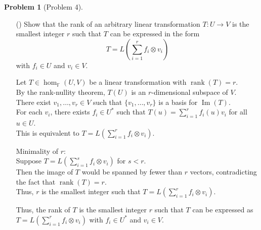 \documentclass[12pt]{article}
\theoremstyle{definition}
\newtheorem{problem}{Problem}
\newcounter{subq}[problem]
\newenvironment{subproblem}
{\refstepcounter{subq} \begin{itemize} \item[(\alph{subq})]}
{\end{itemize} \medskip}
\begin{document}
\begin{problem}[Problem 4]
    \begin{subproblem}
        Show that the rank of an arbitrary linear transformation $T: U \longrightarrow V$
        is the smallest integer $r$ such that $T$ can be expressed in the form
        \[
            T = L(\sum_{i = 1}^{r} f_i \otimes v_i)
        \]
        with $f_i \in U$ and $v_i \in V$.
        
        \begin{solution}
            Let \( T \in \hom_\mathbb{F}(U, V) \) be a linear transformation with \( \operatorname{rank}(T) = r \). \\
            By the rank-nullity theorem, \( T(U) \) is an \( r \)-dimensional subspace of \( V \).\\
            There exist \( v_1, \ldots, v_r \in V \) such that \( \{v_1, \ldots, v_r\} \) is a basis for \( \operatorname{Im}(T) \).\\
            For each \( v_i \), there exists \( f_i \in U^* \) such that \( T(u) = \sum_{i=1}^r f_i(u)v_i \) for all \( u \in U \).\\
            This is equivalent to \( T = L\left(\sum_{i=1}^r f_i \otimes v_i\right) \).

            Minimality of \( r \):\\
            Suppose \( T = L\left(\sum_{i=1}^s f_i \otimes v_i\right) \) for \( s < r \).\\
            Then the image of \( T \) would be spanned by fewer than \( r \) vectors, contradicting the fact that \( \operatorname{rank}(T) = r \).\\
            Thus, \( r \) is the smallest integer such that \( T = L\left(\sum_{i=1}^r f_i \otimes v_i\right) \).

            Thus, the rank of \( T \) is the smallest integer \( r \) such that \( T \) can be expressed as \( T = L\left(\sum_{i=1}^r f_i \otimes v_i\right) \) with \( f_i \in U^* \) and \( v_i \in V \).
        
        \end{solution}
    \end{subproblem}
\end{problem}
\end{document}
